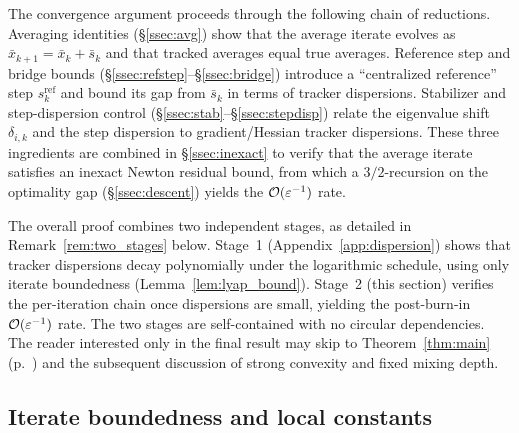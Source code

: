 \documentclass[review,onefignum,onetabnum]{siamart171218}
\begin{document}
The convergence argument proceeds through the following chain of
reductions.
Averaging identities (\S\ref{ssec:avg}) show that the average iterate evolves as
$\bar x_{k+1}=\bar x_k+\bar s_k$ and that tracked averages
equal true averages.
Reference step and bridge bounds
(\S\ref{ssec:refstep}--\S\ref{ssec:bridge}) introduce a
``centralized reference'' step $s_k^{\mathrm{ref}}$ and bound
its gap from $\bar s_k$ in terms of tracker dispersions.
Stabilizer and step-dispersion control
(\S\ref{ssec:stab}--\S\ref{ssec:stepdisp}) relate the
eigenvalue shift $\delta_{i,k}$ and the step dispersion to
gradient/Hessian tracker dispersions.
These three ingredients are combined in \S\ref{ssec:inexact}
to verify that the
average iterate satisfies an inexact Newton residual bound,
from which a $3/2$-recursion on the
optimality gap (\S\ref{ssec:descent}) yields the $\mathcal{O}(\varepsilon^{-1})$ rate.

The overall proof combines two independent stages, as detailed
in Remark~\ref{rem:two_stages} below.
Stage~1 (Appendix~\ref{app:dispersion}) shows that tracker
dispersions decay polynomially under the logarithmic schedule,
using only iterate boundedness (Lemma~\ref{lem:lyap_bound}).
Stage~2 (this section) verifies the per-iteration chain
once dispersions are small, yielding the post-burn-in
$\mathcal{O}(\varepsilon^{-1})$ rate.
The two stages are self-contained with no circular dependencies.
The reader interested only in the final result may skip to
Theorem~\ref{thm:main} (p.~\pageref{thm:main}) and the subsequent
discussion of strong convexity and fixed mixing depth.

\subsection{Iterate boundedness and local constants}\label{ssec:iterate_bound}
\end{document}
